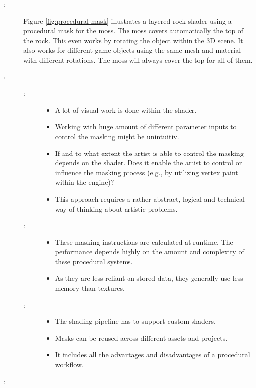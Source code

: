 \begin{description}
	\item[\patExamples:]%
	Figure \ref{fig:procedural mask} illustrates a layered rock shader using a procedural mask for the moss. The moss covers automatically the top of the rock. This even works by rotating the object within the 3D scene. It also works for different game objects using the same mesh and material with different rotations. The moss will always cover the top for all of them. 
	\item[\patConsequences:]\hfill 
		\begin{description}
			\item[\visual:]\hfill
			\begin{itemize}\mynobreakpar
				\item A lot of visual work is done within the shader. 
				\item Working with huge amount of different parameter inputs to control the masking might be unintuitiv. 
				\item If and to what extent the artist is able to control the masking depends on the shader. Does it enable the artist to control or influence the masking process (e.g., by utilizing vertex paint within the engine)? 
				\item This approach requires a rather abstract, logical and technical way of thinking about artistic problems. 
			\end{itemize}
			\item[\performance:]\hfill
			\begin{itemize}\mynobreakpar
				\item These masking instructions are calculated at runtime. The performance depends highly on the amount and complexity of these procedural systems.
				\item As they are less reliant on stored data, they generally use less memory than textures.
			\end{itemize}
			\item[\pipeline:]\hfill
			\begin{itemize}\mynobreakpar
				\item The shading pipeline has to support custom shaders.
				\item Masks can be reused across different assets and projects.
				\item It includes all the advantages and disadvantages of a procedural workflow. 
			\end{itemize}
		\end{description}
	\item[\patRelations:]%

\end{description}
